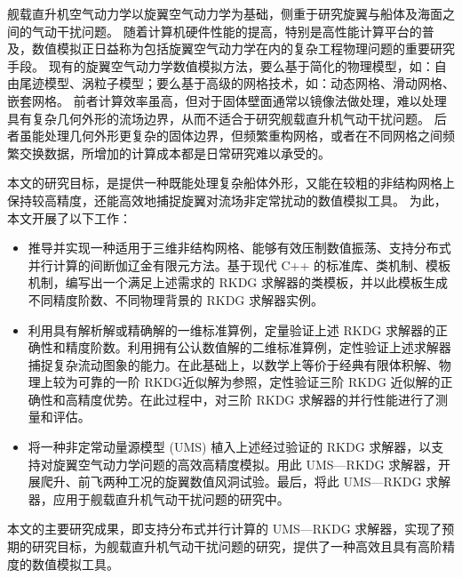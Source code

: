 
\begin{cabstract}
舰载直升机空气动力学以旋翼空气动力学为基础，侧重于研究旋翼与船体及海面之间的气动干扰问题。
随着计算机硬件性能的提高，特别是高性能计算平台的普及，数值模拟正日益称为包括旋翼空气动力学在内的复杂工程物理问题的重要研究手段。
现有的旋翼空气动力学数值模拟方法，要么基于简化的物理模型，如：自由尾迹模型、涡粒子模型；要么基于高级的网格技术，如：动态网格、滑动网格、嵌套网格。
前者计算效率虽高，但对于固体壁面通常以镜像法做处理，难以处理具有复杂几何外形的流场边界，从而不适合于研究舰载直升机气动干扰问题。
后者虽能处理几何外形更复杂的固体边界，但频繁重构网格，或者在不同网格之间频繁交换数据，所增加的计算成本都是日常研究难以承受的。

本文的研究目标，是提供一种既能处理复杂船体外形，又能在较粗的非结构网格上保持较高精度，还能高效地捕捉旋翼对流场非定常扰动的数值模拟工具。
为此，本文开展了以下工作：
\begin{itemize}[wide]
\item 推导并实现一种适用于三维非结构网格、能够有效压制数值振荡、支持分布式并行计算的间断伽辽金有限元方法。基于现代 C++ 的标准库、类机制、模板机制，编写出一个满足上述需求的 RKDG 求解器的类模板，并以此模板生成不同精度阶数、不同物理背景的 RKDG 求解器实例。
\item 利用具有解析解或精确解的一维标准算例，定量验证上述 RKDG 求解器的正确性和精度阶数。利用拥有公认数值解的二维标准算例，定性验证上述求解器捕捉复杂流动图象的能力。在此基础上，以数学上等价于经典有限体积解、物理上较为可靠的一阶 RKDG近似解为参照，定性验证三阶 RKDG 近似解的正确性和高精度优势。在此过程中，对三阶 RKDG 求解器的并行性能进行了测量和评估。
\item 将一种非定常动量源模型 (UMS) 植入上述经过验证的 RKDG 求解器，以支持对旋翼空气动力学问题的高效高精度模拟。用此 UMS—RKDG 求解器，开展爬升、前飞两种工况的旋翼数值风洞试验。最后，将此 UMS—RKDG 求解器，应用于舰载直升机气动干扰问题的研究中。
\end{itemize}

本文的主要研究成果，即支持分布式并行计算的 UMS—RKDG 求解器，实现了预期的研究目标，为舰载直升机气动干扰问题的研究，提供了一种高效且具有高阶精度的数值模拟工具。
\end{cabstract}

